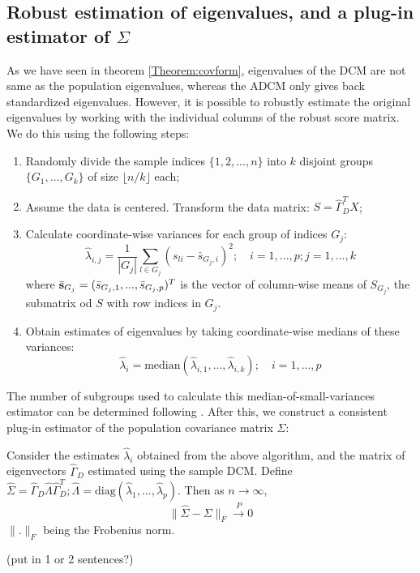 \subsection{Robust estimation of eigenvalues, and a plug-in estimator of $\Sigma$}

As we have seen in theorem \ref{Theorem:covform}, eigenvalues of the DCM are not same as the population eigenvalues, whereas the ADCM only gives back standardized eigenvalues. However, it is possible to robustly estimate the original eigenvalues by working with the individual columns of the robust score matrix. We do this using the following steps:

\begin{enumerate}
\item Randomly divide the sample indices $\{1,2,...,n\}$ into $k$ disjoint groups $\{G_1,...,G_k \}$ of size $\lfloor n/k \rfloor$ each;

\item Assume the data is centered. Transform the data matrix: $S = \hat\Gamma^T_D X$;

\item Calculate coordinate-wise variances for each group of indices $G_j$:
%
$$
\hat\lambda_{i,j} = \frac{1}{|G_j|} \sum_{l \in G_j} (s_{li} - \bar s_{G_j,i})^2; \quad i = 1,...,p; j = 1,...,k
$$
where $\bar{{\bf{s}}}_{G_j} = (\bar s_{G_j,1}, ..., \bar s_{G_j,p})^T$ is the vector of column-wise means of $S_{G_j}$, the submatrix od $S$ with row indices in $G_j$.
%
\item Obtain estimates of eigenvalues by taking coordinate-wise medians of these variances:
%
$$
\hat \lambda_i = \text{median} (\hat\lambda_{i,1}, ... , \hat\lambda_{i,k} ); \quad i = 1,...,p
$$
%
\end{enumerate}
%
The number of subgroups used to calculate this median-of-small-variances estimator can be determined following \citep{Minsker15}. After this, we construct a consistent plug-in estimator of the population covariance matrix $\Sigma$:

\begin{Theorem}\label{Thm:pluginSigma}
Consider the estimates $\hat\lambda_i$ obtained from the above algorithm, and the matrix of eigenvectors $\hat\Gamma_D$ estimated using the sample DCM. Define $\hat\Sigma = \hat\Gamma_D \hat\Lambda \hat\Gamma_D^T; \hat\Lambda = \text{diag}(\hat\lambda_1, ..., \hat\lambda_p)$. Then as $n \rightarrow \infty$,
%
$$ \| \hat\Sigma - \Sigma \|_F \stackrel{P}{\rightarrow} 0 $$
%
$\|.\|_F$ being the Frobenius norm.
\end{Theorem}

{\colrbf (put in 1 or 2 sentences?)}
